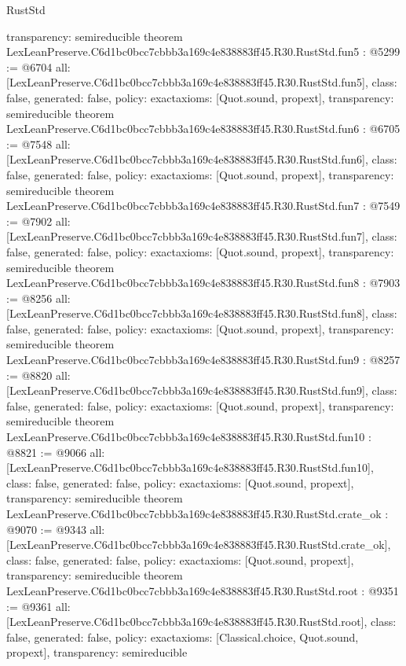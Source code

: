 \begin{lexlean}{RustStd}
\begin{coremodule}
{  transparency: semireducible
}
theorem LexLeanPreserve.C6d1bc0bcc7cbbb3a169c4e838883ff45.R30.RustStd.fun5 : @5299 := @6704 {
  all: [LexLeanPreserve.C6d1bc0bcc7cbbb3a169c4e838883ff45.R30.RustStd.fun5],
  class: false,
  generated: false,
  policy: exact{axioms: [Quot.sound, propext]},
  transparency: semireducible
}
theorem LexLeanPreserve.C6d1bc0bcc7cbbb3a169c4e838883ff45.R30.RustStd.fun6 : @6705 := @7548 {
  all: [LexLeanPreserve.C6d1bc0bcc7cbbb3a169c4e838883ff45.R30.RustStd.fun6],
  class: false,
  generated: false,
  policy: exact{axioms: [Quot.sound, propext]},
  transparency: semireducible
}
theorem LexLeanPreserve.C6d1bc0bcc7cbbb3a169c4e838883ff45.R30.RustStd.fun7 : @7549 := @7902 {
  all: [LexLeanPreserve.C6d1bc0bcc7cbbb3a169c4e838883ff45.R30.RustStd.fun7],
  class: false,
  generated: false,
  policy: exact{axioms: [Quot.sound, propext]},
  transparency: semireducible
}
theorem LexLeanPreserve.C6d1bc0bcc7cbbb3a169c4e838883ff45.R30.RustStd.fun8 : @7903 := @8256 {
  all: [LexLeanPreserve.C6d1bc0bcc7cbbb3a169c4e838883ff45.R30.RustStd.fun8],
  class: false,
  generated: false,
  policy: exact{axioms: [Quot.sound, propext]},
  transparency: semireducible
}
theorem LexLeanPreserve.C6d1bc0bcc7cbbb3a169c4e838883ff45.R30.RustStd.fun9 : @8257 := @8820 {
  all: [LexLeanPreserve.C6d1bc0bcc7cbbb3a169c4e838883ff45.R30.RustStd.fun9],
  class: false,
  generated: false,
  policy: exact{axioms: [Quot.sound, propext]},
  transparency: semireducible
}
theorem LexLeanPreserve.C6d1bc0bcc7cbbb3a169c4e838883ff45.R30.RustStd.fun10 : @8821 := @9066 {
  all: [LexLeanPreserve.C6d1bc0bcc7cbbb3a169c4e838883ff45.R30.RustStd.fun10],
  class: false,
  generated: false,
  policy: exact{axioms: [Quot.sound, propext]},
  transparency: semireducible
}
theorem LexLeanPreserve.C6d1bc0bcc7cbbb3a169c4e838883ff45.R30.RustStd.crate_ok : @9070 := @9343 {
  all: [LexLeanPreserve.C6d1bc0bcc7cbbb3a169c4e838883ff45.R30.RustStd.crate_ok],
  class: false,
  generated: false,
  policy: exact{axioms: [Quot.sound, propext]},
  transparency: semireducible
}
theorem LexLeanPreserve.C6d1bc0bcc7cbbb3a169c4e838883ff45.R30.RustStd.root : @9351 := @9361 {
  all: [LexLeanPreserve.C6d1bc0bcc7cbbb3a169c4e838883ff45.R30.RustStd.root],
  class: false,
  generated: false,
  policy: exact{axioms: [Classical.choice, Quot.sound, propext]},
  transparency: semireducible
}


\end{coremodule}
\end{lexlean}
